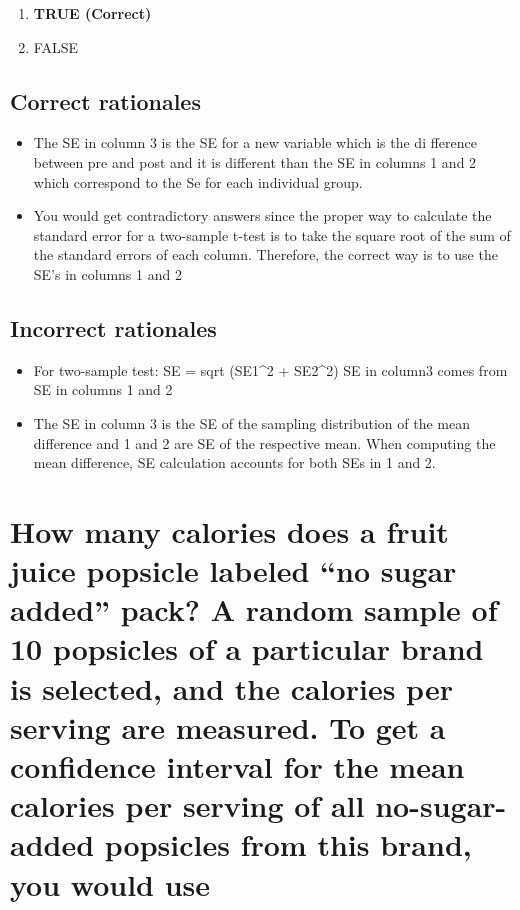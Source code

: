 \documentclass[letterpaper,9pt,twoside,printwatermark=false]{pinp}
\providecommand{\tightlist}{%
  \setlength{\itemsep}{0pt}\setlength{\parskip}{0pt}}
\begin{document}
\begin{enumerate}
\def\labelenumi{\alph{enumi}.}
\tightlist
\item
  \textbf{TRUE (Correct)}
\item
  FALSE
\end{enumerate}

\subsection{Correct rationales}\label{correct-rationales-2}

\begin{itemize}
\tightlist
\item
  The SE in column 3 is the SE for a new variable which is the di
  fference between pre and post and it is different than the SE in
  columns 1 and 2 which correspond to the Se for each individual group.
\item
  You would get contradictory answers since the proper way to calculate
  the standard error for a two-sample t-test is to take the square root
  of the sum of the standard errors of each column. Therefore, the
  correct way is to use the SE's in columns 1 and 2
\end{itemize}

\subsection{Incorrect rationales}\label{incorrect-rationales-2}

\begin{itemize}
\tightlist
\item
  For two-sample test: SE = sqrt (SE1\^{}2 + SE2\^{}2) SE in column3
  comes from SE in columns 1 and 2
\item
  The SE in column 3 is the SE of the sampling distribution of the mean
  difference and 1 and 2 are SE of the respective mean. When computing
  the mean difference, SE calculation accounts for both SEs in 1 and 2.
\end{itemize}

\section{\texorpdfstring{How many calories does a fruit juice popsicle
labeled ``no sugar added'' pack? A random sample of 10 popsicles of a
particular brand is selected, and the calories per serving are measured.
To get a confidence interval for the mean calories per serving of all
no-sugar-added popsicles from this brand, you would
use}{How many calories does a fruit juice popsicle labeled no sugar added pack? A random sample of 10 popsicles of a particular brand is selected, and the calories per serving are measured. To get a confidence interval for the mean calories per serving of all no-sugar-added popsicles from this brand, you would use}}\label{how-many-calories-does-a-fruit-juice-popsicle-labeled-no-sugar-added-pack-a-random-sample-of-10-popsicles-of-a-particular-brand-is-selected-and-the-calories-per-serving-are-measured.-to-get-a-confidence-interval-for-the-mean-calories-per-serving-of-all-no-sugar-added-popsicles-from-this-brand-you-would-use}
\end{document}
